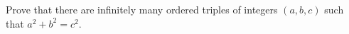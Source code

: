Prove that there are infinitely many ordered triples of integers $(a,b,c)$ such that $a^2+b^2=c^2$.
